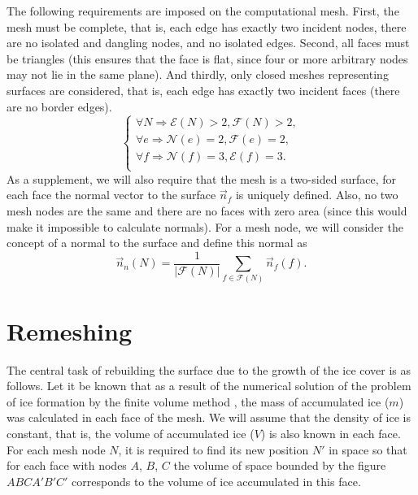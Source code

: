 \documentclass[
11pt,
tightenlines,
twoside,
onecolumn,
nofloats,
nobibnotes,
nofootinbib,
superscriptaddress,
noshowpacs,
centertags]
{revtex4-2}
\begin{document}
The following requirements are imposed on the computational mesh.
First, the mesh must be complete, that is, each edge has exactly two incident nodes, there are no isolated and dangling nodes, and no isolated edges.
Second, all faces must be triangles (this ensures that the face is flat, since four or more arbitrary nodes may not lie in the same plane).
And thirdly, only closed meshes representing  surfaces are
considered, that is, each edge has exactly two incident faces (there
are no border edges).
\begin{equation}\label{eq_arch}
\begin{cases}
\forall N \Rightarrow \mathscr{E}(N) > 2, \mathscr{F}(N) > 2, \\
\forall e \Rightarrow \mathscr{N}(e) = 2 , \mathscr{F}(e) = 2, \\
\forall f \Rightarrow \mathscr{N}(f) = 3 , \mathscr{E}(f) = 3. \\
\end{cases}
\end{equation}
As a supplement, we will also require that the mesh is a two-sided surface, for each face the normal vector to the surface $\vec{n}_f$ is uniquely defined.
Also, no two mesh nodes are the same and there are no faces with zero area (since this would make it impossible to calculate normals).
For a mesh node, we will consider the concept of a normal to the surface and define this normal as
\begin{equation}
\vec{n}_n(N) = \frac{1}{|\mathscr{F}(N)|} \sum_{f \in
\mathscr{F}(N)}{\vec{n}_f(f)}.
\end{equation}


\section{Remeshing}

The central task of rebuilding the surface due to the growth of the ice cover is as follows.
Let it be known that as a result of the numerical solution of the problem of ice formation by the finite volume method \cite{Beaugendre}, the mass of accumulated ice ($m$) was calculated in each face of the mesh.
We will assume that the density of ice is constant, that is, the volume of accumulated ice ($V$) is also known in each face.
For each mesh node $N$, it is required to find its new position $N'$ in space so that for each face with nodes $A$, $B$, $C$ the volume of space bounded by the figure $ABCA'B'C'$ corresponds to the volume of ice accumulated in this face.
\end{document}
